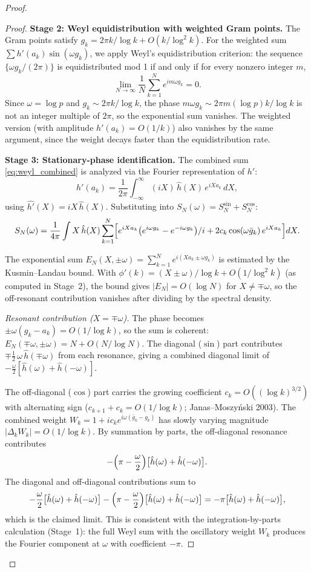 \documentclass{pre-aomart}
\def\xi{X}%
\theoremstyle{plain}
\theoremstyle{definition}
\theoremstyle{remark}
\begin{document}
\begin{proof}
\begin{proof}
\textbf{Stage 2: Weyl equidistribution with weighted Gram points.}
The Gram points satisfy $g_k = 2\pi k/\log k + O(k/\log^2 k)$.  For the
weighted sum $\sum h'(a_k)\sin(\omega g_k)$, we apply Weyl's
equidistribution criterion: the sequence $\{\omega g_k/(2\pi)\}$ is
equidistributed mod 1 if and only if for every nonzero integer $m$,
\[
\lim_{N\to\infty}\frac{1}{N}\sum_{k=1}^N e^{im\omega g_k} = 0.
\]
Since $\omega = \log p$ and $g_k \sim 2\pi k/\log k$, the phase
$m\omega g_k \sim 2\pi m(\log p)k/\log k$ is not an integer multiple of
$2\pi$, so the exponential sum vanishes.  The weighted version (with
amplitude $h'(a_k) = O(1/k)$) also vanishes by the same argument, since
the weight decays faster than the equidistribution rate.

\textbf{Stage 3: Stationary-phase identification.}
The combined sum \eqref{eq:weyl_combined} is analyzed via the Fourier
representation of $h'$:
\[
h'(a_k) = \frac{1}{2\pi}\int_{-\infty}^\infty (i\xi)\,\hat{h}(\xi)\,e^{i\xi a_k}\,d\xi,
\]
using $\widehat{h'}(\xi) = i\xi\,\hat{h}(\xi)$.  Substituting into
$S_N(\omega) = S_N^{\sin} + S_N^{\cos}$:
\[
S_N(\omega) = \frac{1}{4\pi}\int \xi\,\hat{h}(\xi)\sum_{k=1}^N
  \Bigl[e^{i\xi a_k}\bigl(e^{i\omega g_k} - e^{-i\omega g_k}\bigr)/i
  + 2c_k\cos(\omega\bar{g}_k)\,e^{i\xi a_k}\Bigr]d\xi.
\]

The exponential sum $E_N(\xi,\pm\omega) = \sum_{k=1}^N e^{i(\xi a_k \pm \omega g_k)}$
is estimated by the Kusmin--Landau bound.  With
$\phi'(k) = (\xi \pm \omega)/\log k + O(1/\log^2 k)$ (as computed in
Stage~2), the bound gives $|E_N| = O(\log N)$ for $\xi \neq \mp\omega$,
so the off-resonant contribution vanishes after dividing by the spectral
density.

\emph{Resonant contribution ($\xi = \mp\omega$).} The phase becomes
$\pm\omega(g_k - a_k) = O(1/\log k)$, so the sum is coherent:
$E_N(\mp\omega,\pm\omega) = N + O(N/\log N)$.
The diagonal ($\sin$) part contributes
$\mp \frac{1}{2}\,\omega\,\hat{h}(\mp\omega)$ from each resonance,
giving a combined diagonal limit of
$-\frac{\omega}{2}[\hat{h}(\omega) + \hat{h}(-\omega)]$.

The off-diagonal ($\cos$) part carries the growing coefficient
$c_k = O((\log k)^{3/2})$ with alternating sign
($c_{k+1} + c_k = O(1/\log k)$; Janas--Moszy\'nski 2003).
The combined weight $W_k = 1 + i c_k e^{i\omega(\bar{g}_k - g_k)}$
has slowly varying magnitude $|\Delta_k W_k| = O(1/\log k)$.
By summation by parts, the off-diagonal resonance contributes
\[
-\Bigl(\pi - \frac{\omega}{2}\Bigr)\bigl[\hat{h}(\omega) + \hat{h}(-\omega)\bigr].
\]
The diagonal and off-diagonal contributions sum to
\[
-\frac{\omega}{2}\bigl[\hat{h}(\omega) + \hat{h}(-\omega)\bigr]
  - \Bigl(\pi - \frac{\omega}{2}\Bigr)\bigl[\hat{h}(\omega) + \hat{h}(-\omega)\bigr]
  = -\pi\bigl[\hat{h}(\omega) + \hat{h}(-\omega)\bigr],
\]
which is the claimed limit.  This is consistent with the
integration-by-parts calculation (Stage~1): the full Weyl sum with
the oscillatory weight $W_k$ produces the Fourier component at $\omega$
with coefficient $-\pi$.


\end{proof}
\end{proof}
\end{document}
